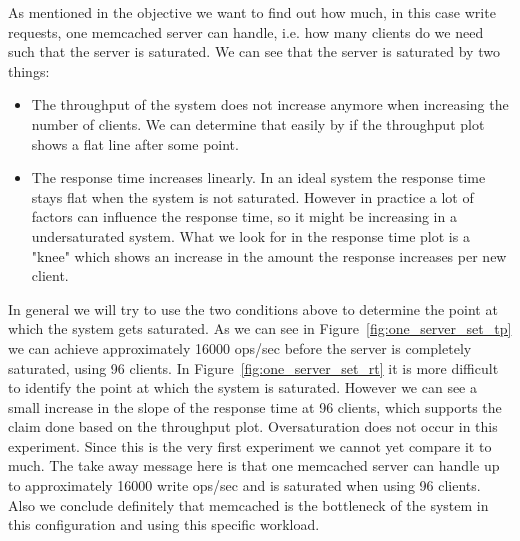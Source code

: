 \documentclass[11pt,a4paper]{article}
\begin{document}
%
As mentioned in the objective we want to find out how much, in this case write requests, one memcached server can handle, i.e. how many clients do we need such that the server is saturated.
%
We can see that the server is saturated by two things:
%
\begin{itemize}
	\item The throughput of the system does not increase anymore when increasing the number of clients. We can determine that easily by if the throughput plot shows a flat line after some point.
	\item The response time increases linearly. In an ideal system the response time stays flat when the system is not saturated. However in practice a lot of factors can influence the response time, so it might be increasing in a undersaturated system. What we look for in the response time plot is a "knee" which shows an increase in the amount the response increases per new client. 
\end{itemize}
%
In general we will try to use the two conditions above to determine the point at which the system gets saturated.
%
As we can see in Figure~\ref{fig:one_server_set_tp} we can achieve approximately 16000 ops/sec before the server is completely saturated, using 96 clients.
%
In Figure~\ref{fig:one_server_set_rt} it is more difficult to identify the point at which the system is saturated. 
%
However we can see a small increase in the slope of the response time at 96 clients, which supports the claim done based on the throughput plot.
%
Oversaturation does not occur in this experiment.
%
Since this is the very first experiment we cannot yet compare it to much.
%
The take away message here is that one memcached server can handle up to approximately 16000 write ops/sec and is saturated when using 96 clients.
%
Also we conclude definitely that memcached is the bottleneck of the system in this configuration and using this specific workload.
%
\end{document}
